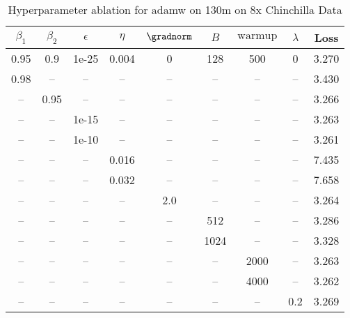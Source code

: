 \begin{table}[h!]
\centering
\caption{Hyperparameter ablation for adamw on 130m on 8x Chinchilla Data}
\label{tab:ablation_adamw_130m_on_8x_chinchilla_data}
\begin{tabular}{ccccccccc}
\toprule
$\beta_1$ & $\beta_2$ & $\epsilon$ & $\eta$ & $\gradnorm$ & $B$ & $\mathrm{warmup}$ & $\lambda$ & Loss \\
\midrule
0.95 & 0.9 & 1e-25 & 0.004 & 0 & 128 & 500 & 0 & 3.270 \\
\midrule
0.98 & -- & -- & -- & -- & -- & -- & -- & 3.430 \\
-- & 0.95 & -- & -- & -- & -- & -- & -- & 3.266 \\
-- & -- & 1e-15 & -- & -- & -- & -- & -- & 3.263 \\
-- & -- & 1e-10 & -- & -- & -- & -- & -- & 3.261 \\
-- & -- & -- & 0.016 & -- & -- & -- & -- & 7.435 \\
-- & -- & -- & 0.032 & -- & -- & -- & -- & 7.658 \\
-- & -- & -- & -- & 2.0 & -- & -- & -- & 3.264 \\
-- & -- & -- & -- & -- & 512 & -- & -- & 3.286 \\
-- & -- & -- & -- & -- & 1024 & -- & -- & 3.328 \\
-- & -- & -- & -- & -- & -- & 2000 & -- & 3.263 \\
-- & -- & -- & -- & -- & -- & 4000 & -- & 3.262 \\
-- & -- & -- & -- & -- & -- & -- & 0.2 & 3.269 \\
\bottomrule
\end{tabular}
\end{table}

